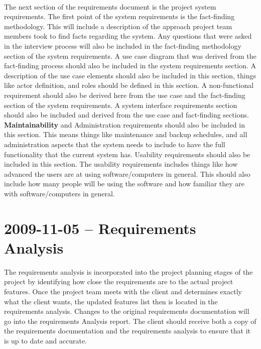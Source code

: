 \documentclass[letterpaper,12pt]{report}
\begin{document}
\paragraph*{}The next section of the requirements document is the project system requirements. The first point of the system requirements is the fact-finding methodology. This will include a description of the approach project team members took to find facts regarding the system. Any questions that were asked in the interview process will also be included in the fact-finding methodology section of the system requirements. A use case diagram that was derived from the fact-finding process should also be included in the system requirements section. A description of the use case elements should also be included in this section, things like actor definition, and roles should be defined in this section. A non-functional requirement should also be derived here from the use case and the fact-finding section of the system requirements. A system interface requirements section should also be included and derived from the use case and fact-finding sections. \textbf{Maintainability} and Administration requirements should also be included in this section. This means things like maintenance and backup schedules, and all administration aspects that the system needs to include to have the full functionality that the current system has. Usability requirements should also be included in this section. The usability requirements includes things like how advanced the users are at using software/computers in general. This should also include how many people will be using the software and how familiar they are with software/computers in general.
\pagebreak

\section{2009-11-05 – Requirements Analysis}
\hspace{1cm}The requirements analysis is incorporated into the project planning stages of the project by identifying how close the requirements are to the actual project features. Once the project team meets with the client and determines exactly what the client wants, the updated features list then is located in the requirements analysis. Changes to the original requirements documentation will go into the requirements Analysis report. The client should receive both a copy of the requirements documentation and the requirements analysis to ensure that it is up to date and accurate. 
\end{document}
